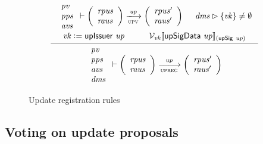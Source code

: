 \begin{figure}[htb]
  \begin{equation}
    \label{eq:rule:up-registration}
    \inference
    {
      {
        \begin{array}{l}
          \var{pv}\\
          \var{pps}\\
          \var{avs}
        \end{array}
      }
      \vdash
      {
        \left(
          \begin{array}{l}
            \var{rpus}\\
            \var{raus}\\
          \end{array}
        \right)
      }
      \trans{upv}{\var{up}}
      {
        \left(
          \begin{array}{l}
            \var{rpus'}\\
            \var{raus'}\\
          \end{array}
        \right)
      }
      &
      \var{dms} \restrictrange \{\var{vk}\} \neq \emptyset\\
      \var{vk} \leteq \upIssuer{up} &
      \mathcal{V}_{\var{vk}}\serialised{\upSigData{up}}_{(\upSig{up})}
    }
    {
      {
        \begin{array}{l}
          \var{pv}\\
          \var{pps}\\
          \var{avs}\\
          \var{dms}
        \end{array}
      }
      \vdash
      {
        \left(
          \begin{array}{l}
            \var{rpus}\\
            \var{raus}
          \end{array}
        \right)
      }
      \trans{upreg}{\var{up}}
      {
        \left(
          \begin{array}{l}
            \var{rpus'}\\
            \var{raus'}
          \end{array}
        \right)
      }
    }
  \end{equation}
  \caption{Update registration rules}
  \label{fig:rules:up-registration}
\end{figure}

\clearpage

\subsection{Voting on update proposals}
\label{sec:voting-on-update-proposals}

